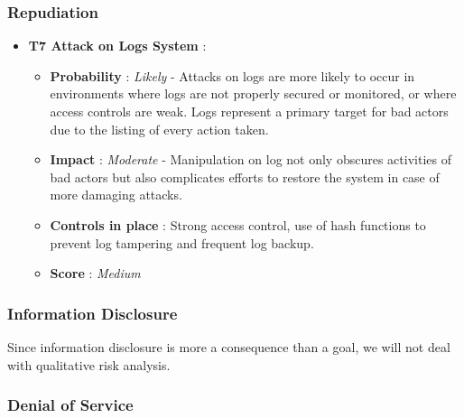 \documentclass[12pt]{article}
\begin{document}
\subsubsection*{ Repudiation }
\begin{itemize}
    \item \textbf{ T7 Attack on Logs System }: 
        \begin{itemize}
            \item  \textbf{ Probability }: \textit{Likely} -  Attacks on logs are more likely to occur in environments where logs are not properly secured or monitored, or where access controls are weak. Logs represent a primary target for bad actors due to the listing of every action taken.
            \item  \textbf{ Impact }:  \textit{Moderate} - Manipulation on log not only obscures activities of bad actors but also complicates efforts to restore the system in case of more damaging attacks.
            \item \textbf{ Controls in place }: Strong access control, use of hash functions to prevent log tampering and frequent log backup.
            \item \textbf{ Score } : \textit{Medium}
         \end{itemize}
\end{itemize}

\subsubsection*{Information Disclosure}
Since information disclosure is more a consequence than a goal, we will not deal with qualitative risk analysis.

\subsubsection*{Denial of Service}
\end{document}

